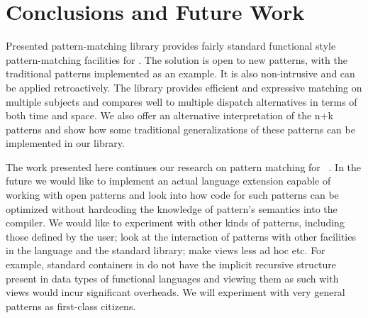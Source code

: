 \section{Conclusions and Future Work} %
\label{sec:cc}

Presented pattern-matching library provides fairly standard functional style 
pattern-matching facilities for \Cpp{}. The solution is open to new patterns, 
with the traditional patterns implemented as an example. It is also 
non-intrusive and can be applied retroactively. %
The library provides efficient and expressive matching on multiple subjects and 
compares well to multiple dispatch alternatives in terms of both time and space.
We also offer an alternative interpretation of the n+k patterns and show how some 
traditional generalizations of these patterns can be implemented in our library. 



The work presented here continues our research on pattern matching for 
\Cpp{}~\cite{TS12}. In the future we would like to implement an actual language 
extension capable of working with open patterns and look into how code for such 
patterns can be optimized without hardcoding the knowledge of pattern's 
semantics into the compiler. 
We would like to experiment with other kinds of patterns, 
including those defined by the user; look at the interaction of patterns with 
other facilities in the language and the standard library; make
views less ad hoc etc. For example, standard containers in \Cpp{} do not have the 
implicit recursive structure present in data types of functional languages and 
viewing them as such with views would incur significant overheads. We will
experiment with very general patterns as first-class citizens.

